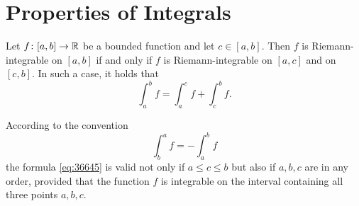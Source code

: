 \section{Properties of Integrals}
%
%

\begin{theorem}
\mymark{*}%
%
%
%
\label{th:additivita_integrale}%
Let $f\colon [a,b]\to {\mathbb R}$ be a bounded function and let $c\in [a,b]$.
Then $f$ is Riemann-integrable on $[a,b]$ if and only if
$f$ is Riemann-integrable on $[a,c]$ and on $[c,b]$.
In such a case, it holds that
\begin{equation}\label{eq:36645}
  \int_a^b f = \int_a^c f + \int_c^b f.
\end{equation}

According to the convention
\[
    \int_b^a f = -\int_a^b f
\]
the formula \eqref{eq:36645} is valid not only if $a\le c\le b$ but also
if $a,b,c$ are in any order, provided that the function $f$ is integrable
on the interval containing all three points $a,b,c$.
\end{theorem}
%
